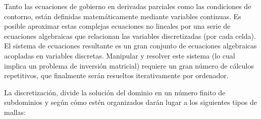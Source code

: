 Tanto las ecuaciones de gobierno en derivadas parciales como las
condiciones de contorno, están definidas matemáticamente mediante
variables continuas. Es posible aproximar estas complejas ecuaciones no
lineales por una serie de ecuaciones algebraicas que relacionan las
variables discretizadas (por cada celda). El sistema de ecuaciones
resultante es un gran conjunto de ecuaciones algebraicas acopladas en
variables discretas. Manipular y resolver este sistema (lo cual implica
un problema de inversión matricial) requiere un gran número de cálculos
repetitivos, que finalmente serán resueltos iterativamente por
ordenador.

La discretización, divide la solución del dominio en un número finito de
subdominios y según cómo estén organizados darán lugar a los siguientes
tipos de mallas:

